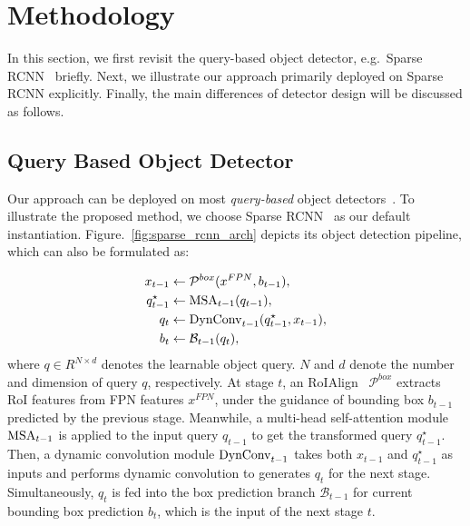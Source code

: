 \documentclass[final]{cvpr}
\begin{document}
\section{Methodology}

In this section, we first revisit the query-based object detector, e.g.\ Sparse RCNN~\cite{sun2020sparse} briefly. Next, we illustrate our approach primarily deployed on Sparse RCNN explicitly. Finally, the main differences of detector design will be discussed as follows.

\subsection{Query Based Object Detector}
Our approach can be deployed on most \emph{query-based} object detectors~\cite{carion2020end, sun2020sparse, zhu2021deformable}. To illustrate the proposed method, we choose Sparse RCNN~\cite{sun2020sparse} as our default instantiation. Figure.~\ref{fig:sparse_rcnn_arch} depicts its object detection pipeline, which can also be formulated as:

\begin{equation}
\begin{split}
    x_{t-1} &\gets \mathcal{P}^{box}(x^{FPN}, b_{t-1}), \\
    q^{\star}_{t-1} &\gets {\rm MSA}_{t-1}(q_{t-1}), \\
    q_{t} &\gets { \rm DynConv}_{t-1}(q^{\star}_{t-1}, x_{t-1}), \\
    b_t &\gets \mathcal{B}_{t-1}(q_t),
\end{split}
\label{equ:iterative_decoder}
\end{equation}
where $q \in R^{N \times d}$ denotes the learnable object query. $N$ and $d$ denote the number and dimension of query $q$, respectively. At stage $t$, an RoIAlign~\cite{he2017mask} $ \mathcal{P}^{box}$ extracts RoI features from FPN features $x^{FPN}$, under the guidance of bounding box $b_{t-1}$ predicted by the previous stage. Meanwhile, a multi-head self-attention module ${\rm MSA}_{t-1}$ is applied to the input query $q_{t-1}$ to get the transformed query $q^{\star}_{t-1}$. Then, a dynamic convolution module ${\rm DynConv}_{t-1}$ takes both $x_{t-1}$ and $q^{\star}_{t-1}$ as inputs and performs dynamic convolution to generates $q_{t}$ for the next stage. Simultaneously, $q_{t}$ is fed into the box prediction branch $\mathcal{B}_{t-1}$ for current bounding box prediction $b_t$, which is the input of the next stage $t$.
\end{document}
